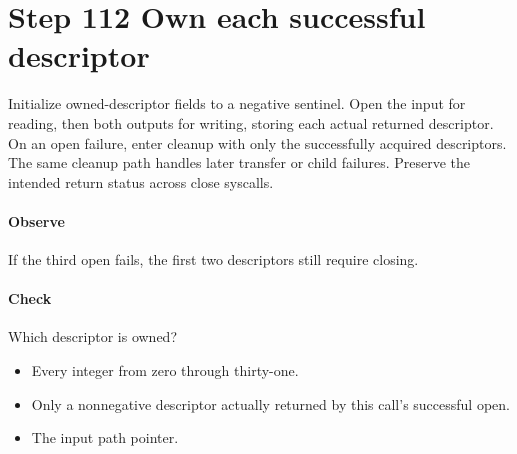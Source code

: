 \section{Step 112 Own each successful descriptor}\label{h263-clip-s02}
Initialize owned-descriptor fields to a negative sentinel. Open the input for
reading, then both outputs for writing, storing each actual returned descriptor.
On an open failure, enter cleanup with only the successfully acquired descriptors.
The same cleanup path handles later transfer or child failures. Preserve the
intended return status across close syscalls.

\paragraph{Observe} If the third open fails, the first two descriptors still require closing.
\paragraph{Check} Which descriptor is owned?
\begin{itemize}
  \item[A.] Every integer from zero through thirty-one.
  \item[B.] Only a nonnegative descriptor actually returned by this call's successful open.
  \item[C.] The input path pointer.
\end{itemize}

